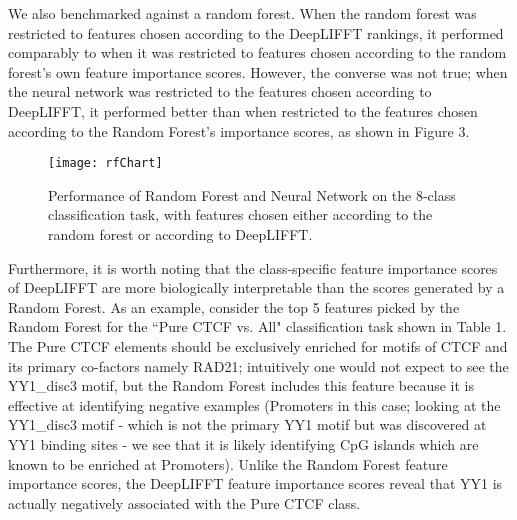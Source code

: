 \documentclass{article}
\begin{document}
We also benchmarked against a random forest. When the random forest was restricted to features chosen according to the DeepLIFFT rankings, it performed comparably to when it was restricted to features chosen according to the random forest's own feature importance scores. However, the converse was not true; when the neural network was restricted to the features chosen according to DeepLIFFT, it performed better than when restricted to the features chosen according to the Random Forest's importance scores, as shown in Figure 3.

\begin{figure}[!ht]
\begin{center}
\centerline{\texttt{[image: rfChart]}}
\caption{Performance of Random Forest and Neural Network on the 8-class classification task, with features chosen either according to the random forest or according to DeepLIFFT.}
\label{rfChart}
\end{center}
\end{figure} 

Furthermore, it is worth noting that the class-specific feature importance scores of DeepLIFFT are more biologically interpretable than the scores generated by a Random Forest. As an example, consider the top 5 features picked by the Random Forest for the ``Pure CTCF vs. All" classification task shown in Table 1. The Pure CTCF elements should be exclusively enriched for motifs of CTCF and its primary co-factors namely RAD21; intuitively one would not expect to see the YY1\_disc3 motif, but the Random Forest includes this feature because it is effective at identifying negative examples (Promoters in this case; looking at the YY1\_disc3 motif - which is not the primary YY1 motif but was discovered at YY1 binding sites - we see that it is likely identifying CpG islands which are known to be enriched at Promoters). Unlike the Random Forest feature importance scores, the DeepLIFFT feature importance scores reveal that YY1 is actually negatively associated with the Pure CTCF class.
\end{document}
